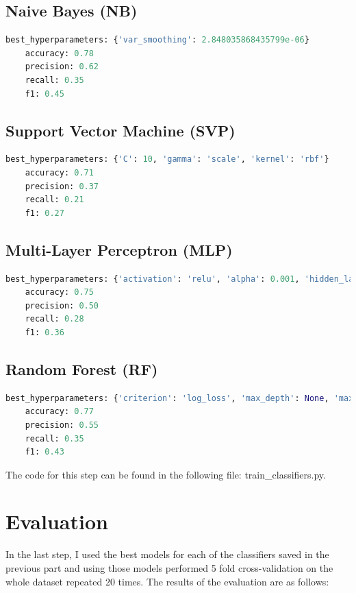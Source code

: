 \documentclass{article}
\begin{document}
\subsection{Naive Bayes (NB)}
\begin{lstlisting}[language=Python, basicstyle=\small\ttfamily, frame=single, breaklines=true]
    best_hyperparameters: {'var_smoothing': 2.848035868435799e-06}
    accuracy: 0.78
    precision: 0.62
    recall: 0.35
    f1: 0.45
\end{lstlisting}
\subsection{Support Vector Machine (SVP)}
\begin{lstlisting}[language=Python, basicstyle=\small\ttfamily, frame=single, breaklines=true]
    best_hyperparameters: {'C': 10, 'gamma': 'scale', 'kernel': 'rbf'}
    accuracy: 0.71
    precision: 0.37
    recall: 0.21
    f1: 0.27
\end{lstlisting}
\subsection{Multi-Layer Perceptron (MLP)}
\begin{lstlisting}[language=Python, basicstyle=\small\ttfamily, frame=single, breaklines=true]
    best_hyperparameters: {'activation': 'relu', 'alpha': 0.001, 'hidden_layer_sizes': (100,), 'learning_rate': 'adaptive', 'solver': 'sgd'}
    accuracy: 0.75
    precision: 0.50
    recall: 0.28
    f1: 0.36
\end{lstlisting}
\subsection{Random Forest (RF)}
\begin{lstlisting}[language=Python, basicstyle=\small\ttfamily, frame=single, breaklines=true]
    best_hyperparameters: {'criterion': 'log_loss', 'max_depth': None, 'max_features': 'log2', 'min_samples_leaf': 5, 'n_estimators': 10}
    accuracy: 0.77
    precision: 0.55
    recall: 0.35
    f1: 0.43
\end{lstlisting}
The code for this step can be found in the following file: train\_classifiers.py.

\section{Evaluation}
In the last step, I used the best models for each of the classifiers saved in the previous part
and using those models performed 5 fold cross-validation on the whole dataset repeated 20 times. The results of the evaluation are as follows:
\end{document}
